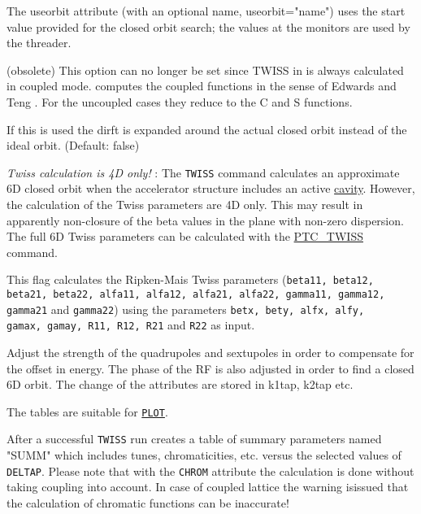 \begin{madlist}
   The useorbit attribute (with an optional name,
  useorbit="name") uses the start value provided for the closed
  orbit search; the values at the monitors are used by the
  threader.    

   (obsolete) This \madeight option can no
  longer be set since TWISS in \madx is always calculated in
  coupled mode. \madx computes the coupled functions in the
  sense of Edwards and Teng \cite{edwards1973}. 
  For the uncoupled cases they reduce to the C and S functions. 

   If this is used the dirft is expanded around the actual
  closed orbit instead of the ideal orbit. (Default: false)   
  
  \textit{ Twiss calculation is 4D only!} : The \texttt{TWISS}
  command calculates an approximate 6D closed orbit when the
  accelerator structure includes an active
  \hyperref[sec:rfcavity]{cavity}. However, the
  calculation of the Twiss parameters are 4D only. This may
  result in apparently non-closure of the beta values in the
  plane with non-zero dispersion. The full 6D Twiss parameters
  can be calculated with the
  \hyperref[chap:ptc-twiss]{PTC\_TWISS} command.    

   This flag calculates the Ripken-Mais Twiss
  parameters (\texttt{beta11, beta12, beta21, beta22, alfa11, alfa12,
  alfa21, alfa22, gamma11, gamma12, gamma21} and \texttt{gamma22}) using
  the parameters \texttt{betx, bety, alfx, alfy, \\ gamax, gamay, R11, R12,
    R21} and \texttt{R22} as input.

   Adjust the strength of the quadrupoles and sextupoles
  in order to compensate for the offset in energy. The phase of the RF is
  also adjusted in order to find a closed 6D orbit. The change of the 
  attributes are stored in k1tap, k2tap etc.  

\end{madlist}

The tables are suitable for \hyperref[chap:plot]{\texttt{PLOT}}.

After a successful \texttt{TWISS} run \madx creates a 
table of summary parameters named "SUMM" which includes tunes,
chromaticities, etc. versus the selected values of \texttt{DELTAP}.
Please note that with the \texttt{CHROM} attribute the calculation is done without
taking coupling into account. In case of coupled lattice the warning isissued that
the calculation of chromatic functions can be inaccurate!

